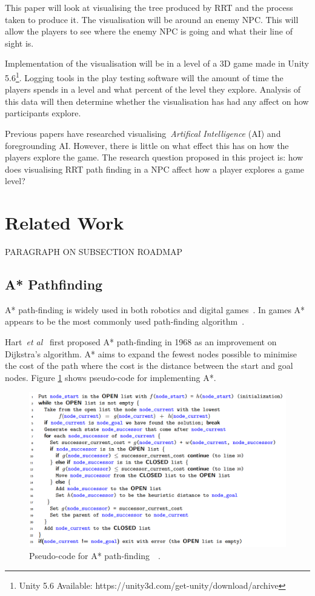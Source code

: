\documentclass[journal]{IEEEtran}
\begin{document}
This paper will look at visualising the tree produced by RRT and the process taken to produce it. The visualisation will be around an enemy NPC. This will allow the players to see where the enemy NPC is going and what their line of sight is. 

Implementation of the visualisation will be in a level of a 3D game made in Unity 5.6\footnote[1]{Unity 5.6 Available: https://unity3d.com/get-unity/download/archive}. Logging tools in the play testing software will  the amount of time the players spends in a level and what percent of the level they explore. Analysis of this data will then determine whether the visualisation has had any affect on how participants explore.

Previous papers have researched visualising~\textit{Artifical Intelligence} (AI) and foregrounding AI. However, there is little on what effect this has on how the players explore the game.
The research question proposed in this project is: how does visualising RRT path finding in a NPC affect how a player explores a game level?

\section{Related Work} \label{RelatedWork}
PARAGRAPH ON SUBSECTION ROADMAP

\subsection{A* Pathfinding} \label{A*PF}
A* path-finding is widely used in both robotics and digital games~\cite{Algfoor2015}. In games A* appears to be the most commonly used path-finding algorithm~\cite{Algfoor2015}.

Hart~\textit{et al}~\cite{Hart1968} first proposed A* path-finding in 1968 as an improvement on Dijkstra's algorithm. A* aims to expand the fewest nodes possible to minimise the cost of the path where the cost is the distance between the start and  goal nodes. Figure \ref{A*Pseudo} shows pseudo-code for implementing A*. 

\begin{figure}[h]
	\includegraphics[width=1.0\linewidth]{APseudocode.png}
	\caption{ Pseudo-code for A* path-finding~\cite{Hart1968}~\cite{pseudocode:A*}.}
	\label{A*Pseudo}
\end{figure} 
\end{document}
